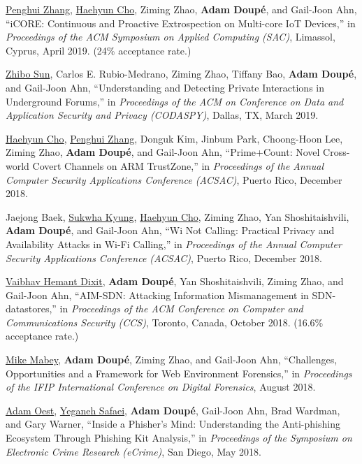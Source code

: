 \documentclass[11pt,letterpaper,sans]{moderncv}
\begin{document}
\begin{etaremune}
 \item \underline{Penghui Zhang}, \underline{Haehyun Cho}, Ziming Zhao, \textbf{Adam Doup\'e}, and Gail-Joon Ahn, ``iCORE: Continuous and Proactive Extrospection on Multi-core IoT Devices,'' in \emph{Proceedings of the ACM Symposium on Applied Computing (SAC)}, Limassol, Cyprus, April 2019. (24\% acceptance rate.)

\item \underline{Zhibo Sun}, Carlos E.
Rubio-Medrano, Ziming Zhao, Tiffany Bao, \textbf{Adam Doup\'e}, and Gail-Joon Ahn, ``Understanding and Detecting Private Interactions in Underground Forums,'' in \emph{Proceedings of the ACM on Conference on Data and Application Security and Privacy (CODASPY)}, Dallas, TX, March 2019.

\item \underline{Haehyun Cho}, \underline{Penghui Zhang}, Donguk Kim, Jinbum Park, Choong-Hoon Lee, Ziming Zhao, \textbf{Adam Doup\'e}, and Gail-Joon Ahn, ``Prime+Count: Novel Cross-world Covert Channels on ARM TrustZone,'' in \emph{Proceedings of the Annual Computer Security Applications Conference (ACSAC)}, Puerto Rico, December 2018.

\item Jaejong Baek, \underline{Sukwha Kyung}, \underline{Haehyun Cho}, Ziming Zhao, Yan Shoshitaishvili, \textbf{Adam Doup\'e}, and Gail-Joon Ahn, ``Wi Not Calling: Practical Privacy and Availability Attacks in Wi-Fi Calling,'' in \emph{Proceedings of the Annual Computer Security Applications Conference (ACSAC)}, Puerto Rico, December 2018.

\item \underline{Vaibhav Hemant Dixit}, \textbf{Adam Doup\'e}, Yan
  Shoshitaishvili, Ziming Zhao, and Gail-Joon Ahn, ``AIM-SDN:
  Attacking Information Mismanagement in SDN-datastores,'' in
  \emph{Proceedings of the ACM Conference on Computer and
    Communications Security (CCS)}, Toronto, Canada, October 2018. (16.6\% acceptance rate.)

\item \underline{Mike Mabey}, \textbf{Adam Doup\'e}, Ziming Zhao, and Gail-Joon Ahn, ``Challenges, Opportunities and a Framework for Web Environment Forensics,'' in \emph{Proceedings of the IFIP International Conference on Digital Forensics}, August 2018.


\item \underline{Adam Oest}, \underline{Yeganeh Safaei}, \textbf{Adam Doup\'e},
  Gail-Joon Ahn, Brad Wardman, and Gary Warner, ``Inside a Phisher's
  Mind: Understanding the Anti-phishing Ecosystem Through Phishing Kit
  Analysis,'' in \emph{Proceedings of the Symposium on Electronic
    Crime Research (eCrime)}, San Diego, May 2018.


\end{etaremune}
\end{document}
